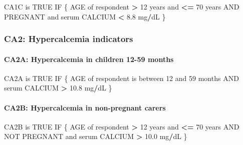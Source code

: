 \documentclass[12pt,a4paper]{article}
\newenvironment{Shaded}{\begin{snugshade}}{\end{snugshade}}
\newcommand{\DecValTok}[1]{\textcolor[rgb]{0.00,0.00,0.81}{#1}}
\newcommand{\FloatTok}[1]{\textcolor[rgb]{0.00,0.00,0.81}{#1}}
\newcommand{\NormalTok}[1]{#1}
\newcommand{\OperatorTok}[1]{\textcolor[rgb]{0.81,0.36,0.00}{\textbf{#1}}}
\newcommand{\OtherTok}[1]{\textcolor[rgb]{0.56,0.35,0.01}{#1}}
\newcommand{\StringTok}[1]{\textcolor[rgb]{0.31,0.60,0.02}{#1}}
\let\oldparagraph\paragraph
\renewcommand{\paragraph}[1]{\oldparagraph{#1}\mbox{}}
\begin{document}
\begin{Shaded}
\begin{Highlighting}[]
\NormalTok{CA1C is }\OtherTok{TRUE}\NormalTok{ IF}
\NormalTok{  \{}
\NormalTok{    AGE of respondent }\OperatorTok{>}\StringTok{ }\DecValTok{12}\NormalTok{ years and }\OperatorTok{<=}\StringTok{ }\DecValTok{70}\NormalTok{ years AND}
\NormalTok{      PREGNANT and serum CALCIUM }\OperatorTok{<}\StringTok{ }\FloatTok{8.8}\NormalTok{ mg}\OperatorTok{/}\NormalTok{dL}
\NormalTok{  \}}
\end{Highlighting}
\end{Shaded}

\hypertarget{ca2-hypercalcemia-indicators}{%
\subsubsection{CA2: Hypercalcemia indicators}\label{ca2-hypercalcemia-indicators}}

\hypertarget{ca2a-hypercalcemia-in-children-12-59-months}{%
\paragraph{CA2A: Hypercalcemia in children 12-59 months}\label{ca2a-hypercalcemia-in-children-12-59-months}}

\begin{Shaded}
\begin{Highlighting}[]
\NormalTok{CA2A is }\OtherTok{TRUE}\NormalTok{ IF}
\NormalTok{  \{}
\NormalTok{    AGE of respondent is between }\DecValTok{12}\NormalTok{ and }\DecValTok{59}\NormalTok{ months AND }
\NormalTok{      serum CALCIUM }\OperatorTok{>}\StringTok{ }\FloatTok{10.8}\NormalTok{ mg}\OperatorTok{/}\NormalTok{dL}
\NormalTok{  \}}
\end{Highlighting}
\end{Shaded}

\hypertarget{ca2b-hypercalcemia-in-non-pregnant-carers}{%
\paragraph{CA2B: Hypercalcemia in non-pregnant carers}\label{ca2b-hypercalcemia-in-non-pregnant-carers}}

\begin{Shaded}
\begin{Highlighting}[]
\NormalTok{CA2B is }\OtherTok{TRUE}\NormalTok{ IF}
\NormalTok{  \{}
\NormalTok{    AGE of respondent }\OperatorTok{>}\StringTok{ }\DecValTok{12}\NormalTok{ years and }\OperatorTok{<=}\StringTok{ }\DecValTok{70}\NormalTok{ years AND}
\NormalTok{      NOT PREGNANT and serum CALCIUM }\OperatorTok{>}\StringTok{ }\FloatTok{10.0}\NormalTok{ mg}\OperatorTok{/}\NormalTok{dL}
\NormalTok{  \}}
\end{Highlighting}
\end{Shaded}
\end{document}
